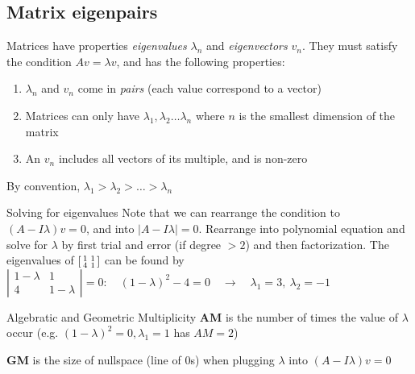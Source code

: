 \documentclass{article}
\begin{document}
\subsection{Matrix eigenpairs}
\label{sec:eigen}
Matrices have properties \emph{eigenvalues} $\lambda_n$ and \emph{eigenvectors} $v_n$. They must satisfy the condition $Av=\lambda v$, and has the following properties:
\begin{enumerate}
    \item $\lambda_n$ and $v_n$ come in \emph{pairs} (each value correspond to a vector)
    \item Matrices can only have $\lambda_1, \lambda_2 \dots \lambda_n$ where $n$ is the smallest dimension of the matrix
    \item An $v_n$ includes all vectors of its multiple, and is non-zero
\end{enumerate}
By convention, $\lambda_1 > \lambda_2 > \dots > \lambda_n$
\begin{knBox}[]{Solving for eigenvalues}
    Note that we can rearrange the condition to $(A-I\lambda)v=0$, and into $|A-I\lambda| = 0$. Rearrange into polynomial equation and solve for $\lambda$ by first trial and error (if degree $> 2$) and then factorization.
    \tcblower
    The eigenvalues of $\begin{bsmallmatrix}
        1&1\\4&1
    \end{bsmallmatrix}$ can be found by $|\begin{smallmatrix}
        1-\lambda&1\\4&1-\lambda
    \end{smallmatrix}|=0:\quad(1-\lambda)^2 - 4 = 0\quad\rightarrow\quad\lambda_1=3,\ \lambda_2=-1$
\end{knBox}
\begin{propBox}[]{Algebratic and Geometric Multiplicity}
    \textbf{AM} is the number of times the value of $\lambda$ occur (e.g. $(1-\lambda)^2=0, \lambda_1=1$ has $AM=2$)

    \textbf{GM} is the size of nullspace (line of 0s) when plugging $\lambda$ into $(A-I\lambda)v=0$
\end{propBox}
\end{document}
